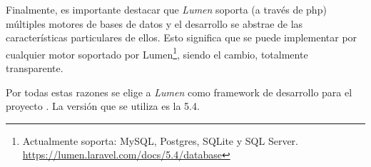 
Finalmente, es importante destacar que \textit{Lumen} soporta (a través de \gls{php}) múltiples motores de bases de datos y el desarrollo se abstrae de las características particulares de ellos. Esto significa que se puede implementar por cualquier motor soportado por Lumen\footnote{Actualmente soporta: MySQL, Postgres, SQLite y SQL Server. \url{https://lumen.laravel.com/docs/5.4/database}}, siendo el cambio, totalmente transparente.

Por todas estas razones se elige a \textit{Lumen} como \gls{framework} de desarrollo para el proyecto . La versión que se utiliza es la 5.4.
